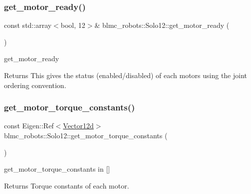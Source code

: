\subsubsection{\texorpdfstring{get\+\_\+motor\+\_\+ready()}{get\_motor\_ready()}}
{\footnotesize\ttfamily const std\+::array$<$bool, 12$>$\& blmc\+\_\+robots\+::\+Solo12\+::get\+\_\+motor\+\_\+ready (\begin{DoxyParamCaption}{ }\end{DoxyParamCaption})\hspace{0.3cm}{\ttfamily [inline]}}



get\+\_\+motor\+\_\+ready 

\begin{DoxyReturn}{Returns}
This gives the status (enabled/disabled) of each motors using the joint ordering convention. 
\end{DoxyReturn}
\mbox{\label{classblmc__robots_1_1Solo12_a2135c79bff566dc0f8bace78bcf0b714}} 
\subsubsection{\texorpdfstring{get\+\_\+motor\+\_\+torque\+\_\+constants()}{get\_motor\_torque\_constants()}}
{\footnotesize\ttfamily const Eigen\+::\+Ref$<$\hyperlink{common__header_8hpp_a80313eb420184518596e745eecf4b494}{Vector12d}$>$ blmc\+\_\+robots\+::\+Solo12\+::get\+\_\+motor\+\_\+torque\+\_\+constants (\begin{DoxyParamCaption}{ }\end{DoxyParamCaption})\hspace{0.3cm}{\ttfamily [inline]}}



get\+\_\+motor\+\_\+torque\+\_\+constants in \mbox{[}\mbox{]} 

\begin{DoxyReturn}{Returns}
Torque constants of each motor. 
\end{DoxyReturn}
\mbox{\label{classblmc__robots_1_1Solo12_a2881a38d56aece096ca2c0ca42f2d56c}} 
